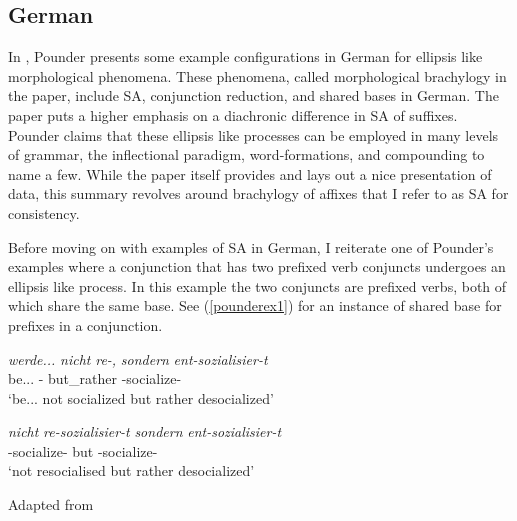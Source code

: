 \subsection{German}

In \cite{pounder2006broken}, Pounder presents some example configurations in German for ellipsis like morphological phenomena. These phenomena, called morphological brachylogy in the paper, include SA, conjunction reduction, and shared bases in German. The paper puts a higher emphasis on a diachronic difference in SA of suffixes. Pounder claims that these ellipsis like processes can be employed in many levels of grammar, the inflectional paradigm, word-formations, and compounding to name a few. While the paper itself provides and lays out a nice presentation of data, this summary revolves around brachylogy of affixes that I refer to as SA for consistency.

Before moving on with examples of SA in German, I reiterate one of Pounder's examples where a conjunction that has two prefixed verb conjuncts undergoes an ellipsis like process. In this example the two conjuncts are prefixed verbs, both of which share the same base. See (\ref{pounderex1}) for an instance of shared base for prefixes in a conjunction. 

\begin{exe}
    \ex \label{pounderex1}
    \begin{xlist}
        \ex \label{pounderex1a} 
        \gll 
        \textit{werde...} \textit{nicht} \textit{re-,} \textit{sondern} \textit{ent-sozialisier-t} \\ be... {\Neg} {\Pref}- but\_rather {\Pref}-socialize-{\Part} \\
        \glt `be... not socialized but rather desocialized'
    
        \ex \label{pounderex1b}
        \gll 
        \textit{nicht} \textit{re-sozialisier-t} \textit{sondern} \textit{ent-sozialisier-t} \\ {\Neg} {\Pref}-socialize-{\Part} but {\Pref}-socialize-{\Part} \\
        \glt `not resocialised but rather desocialized'
    \end{xlist}
\hfill Adapted from \cite{pounder2006broken}
\end{exe}

